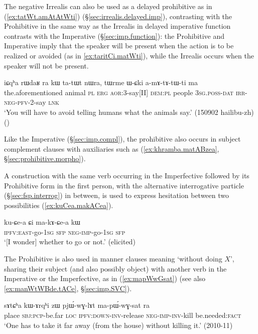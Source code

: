 The negative Irrealis can also be used as a delayed prohibitive as in (\ref{ex:tatWt.amAtAtWti}) (§\ref{sec:irrealis.delayed.imp}), contrasting with the Prohibitive in the same way as the Irrealis in delayed imperative function contrasts with the Imperative (§\ref{sec:imp.function}): the Prohibitive and Imperative imply that the speaker will be present when the action is to be realized or avoided (as in \ref{ex:taritCi.matWti}), while the Irrealis occurs when the speaker will not be present. 

\begin{exe}
\ex  \label{ex:tatWt.amAtAtWti}
\gll iɕqʰa rɯdaʁ ra kɯ ta-tɯt nɯra, tɯrme ɯ-ɕki a-mɤ-tɤ-tɯ-ti ma \\
the.aforementioned animal \textsc{pl} \textsc{erg} \textsc{aor}:3\flobv{}-say[II] \textsc{dem}:\textsc{pl} people \textsc{3sg}.\textsc{poss}-\textsc{dat} \textsc{irr}-\textsc{neg}-\textsc{pfv}-2-say \textsc{lnk} \\
\glt `You will have to avoid telling humans what the animals say.' (150902 hailibu-zh)
()
\end{exe}

Like the Imperative (§\ref{sec:imp.compl}), the prohibitive also occurs in subject complement clauses with auxiliaries such as  (\ref{ex:khramba.matABzea}, §\ref{sec:prohibitive.morpho}).


A construction with the same verb occurring in the Imperfective followed by its Prohibitive form in the first person, with the alternative interrogative particle  (§\ref{sec:fsp.interrog}) in between, is used to express hesitation between two possibilities (\ref{ex:kuCea.makACea}).

\begin{exe}
\ex  \label{ex:kuCea.makACea}
\gll ku-ɕe-a ɕi ma-kɤ-ɕe-a kɯ \\
\textsc{ipfv}:\textsc{east}-go-\textsc{1sg} \textsc{sfp} \textsc{neg}-\textsc{imp}-go-\textsc{1sg} \textsc{sfp} \\
\glt `[I wonder] whether to go or not.' (elicited)
\end{exe}

The Prohibitive is also used in manner clauses meaning `without doing $X$', sharing their subject (and also possibly object) with another verb in the Imperative or the Imperfective, as in (\ref{ex:mapWwGsat}) (see also \ref{ex:manWtWBde.tACe}, §\ref{sec:imp.SVC}).

\begin{exe}
\ex  \label{ex:mapWwGsat}
\gll  sɤtɕʰa kɯ-ɤrqʰi zɯ pjɯ́-wɣ-lɤt ma-pɯ́-wɣ-sat ra \\
place \textsc{sbj}:\textsc{pcp}-be.far \textsc{loc} \textsc{ipfv}:\textsc{down}-\textsc{inv}-release \textsc{neg}-\textsc{imp}-\textsc{inv}-kill be.needed:\textsc{fact} \\
\glt `One has to take it far away (from the house) without killing it.' (2010-11)
\end{exe}


